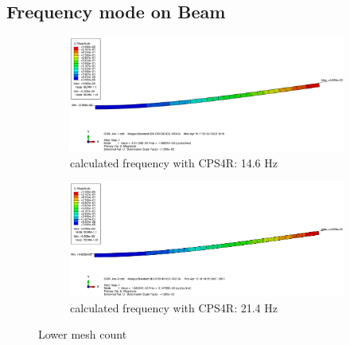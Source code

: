 \documentclass[12pt]{article}
\begin{document}
\subsection{Frequency mode on Beam}

\begin{figure}[!htb]
  \centering
  \begin{subfigure}{.5\textwidth}
    \centering
    \includegraphics[width=0.95\linewidth]{pics/Beam_1_CPS4R}
    \caption{calculated frequency with CPS4R: 14.6 Hz}
  \end{subfigure}%
  \begin{subfigure}{.5\textwidth}
    \centering
    \includegraphics[width=0.95\linewidth]{pics/Beam_1_CPS8R}
    \caption{calculated frequency with CPS4R: 21.4 Hz}
   \end{subfigure}
  \caption{Lower mesh count}
  \label{fig:1}
\end{figure}
\end{document}
